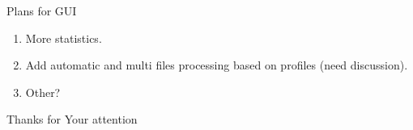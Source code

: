 \documentclass[10pt,usenames,dvipsnames]{beamer}
\begin{document}
\begin{frame}[c]{Plans for GUI}
  \begin{enumerate}
    \item More statistics.
    \item Add automatic and multi files processing based on profiles (need discussion).
    \item Other?
  \end{enumerate}  
\end{frame}
\begin{frame}
  \begin{center}
    \Huge Thanks for Your attention
  \end{center}
\end{frame}
\end{document}
